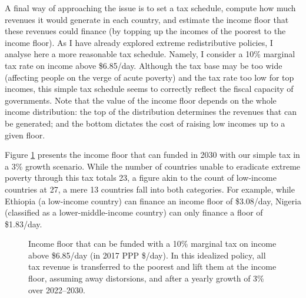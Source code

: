 \documentclass[12pt,english]{article}
\begin{document}
A final way of approaching the issue is to set a tax schedule, compute how much revenues it would generate in each country, and estimate the income floor that these revenues could finance (by topping up the incomes of the poorest to the income floor). As I have already explored extreme redistributive policies, I analyse here a more reasonable tax schedule. Namely, I consider a 10\% marginal tax rate on income above \$6.85/day. Although the tax base may be too wide (affecting people on the verge of acute poverty) %
and the tax rate too low for top incomes, 
this simple tax schedule seems to correctly reflect the fiscal capacity of governments. Note that the value of the income floor depends on the whole income distribution: the top of the distribution determines the revenues that can be generated; and the bottom dictates the cost of raising low incomes up to a given floor. 

Figure \ref{fig:demogrant_7__10} presents the income floor that can funded in 2030 with our simple tax in a 3\% growth scenario. While the number of countries unable to eradicate extreme poverty through this tax totals 23, a figure akin to the count of low-income countries at 27, a mere 13 countries fall into both categories.
For example, while Ethiopia (a low-income country) can finance an income floor of \$3.08/day, Nigeria (classified as a lower-middle-income country) can only finance a floor of \$1.83/day. 

\begin{figure}[t!]
  \caption[Income floor of 10\% tax above \$6.85/day in 2030 after 3\% growth.]{Income floor that can be funded with a 10\% marginal tax on income above \$6.85/day (in 2017 PPP \$/day). In this idealized policy, all tax revenue is transferred to the poorest and lift them at the income floor, assuming away distorsions, and after a yearly growth of 3\% over 2022--2030. 
  }\label{fig:demogrant_7__10}
\end{figure}
\end{document}
